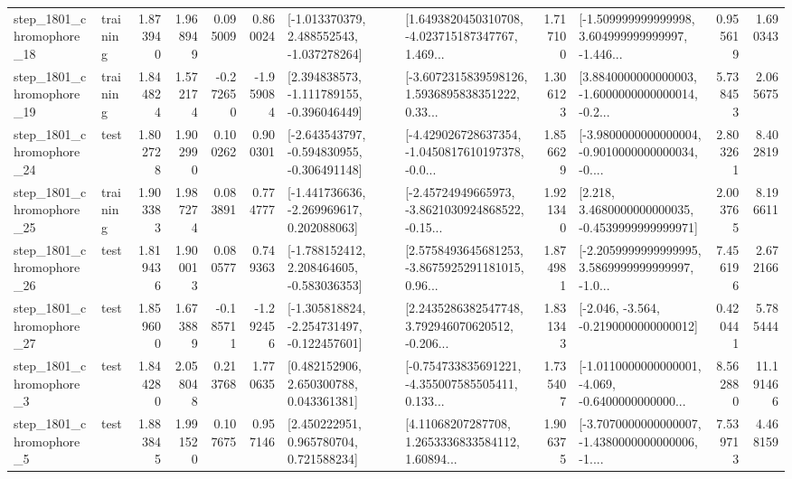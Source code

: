 \begin{tabular}{llrrrrllrlrr}
 step\_1801\_chromophore\_18 &  training &      1.873940 &    1.968949 &      0.095009 &  0.860024 &   [-1.013370379, 2.488552543, -1.037278264] &  [1.6493820450310708, -4.023715187347767, 1.469... &       1.717100 &  [-1.509999999999998, 3.604999999999997, -1.446... &            0.955619 &          1.690343 \\
 step\_1801\_chromophore\_19 &  training &      1.844824 &    1.572174 &     -0.272650 & -1.959084 &   [2.394838573, -1.111789155, -0.396046449] &  [-3.6072315839598126, 1.5936895838351222, 0.33... &       1.306123 &  [3.8840000000000003, -1.6000000000000014, -0.2... &            5.738453 &          2.065675 \\
 step\_1801\_chromophore\_24 &      test &      1.802728 &    1.902990 &      0.100262 &  0.900301 &  [-2.643543797, -0.594830955, -0.306491148] &  [-4.429026728637354, -1.0450817610197378, -0.0... &       1.856629 &  [-3.9800000000000004, -0.9010000000000034, -0.... &            2.803261 &          8.402819 \\
 step\_1801\_chromophore\_25 &  training &      1.903383 &    1.987274 &      0.083891 &  0.774777 &   [-1.441736636, -2.269969617, 0.202088063] &  [-2.45724949665973, -3.8621030924868522, -0.15... &       1.921340 &   [2.218, 3.4680000000000035, -0.4539999999999971] &            2.003765 &          8.196611 \\
 step\_1801\_chromophore\_26 &      test &      1.819436 &    1.900013 &      0.080577 &  0.749363 &   [-1.788152412, 2.208464605, -0.583036353] &  [2.5758493645681253, -3.8675925291181015, 0.96... &       1.874981 &  [-2.2059999999999995, 3.5869999999999997, -1.0... &            7.456196 &          2.672166 \\
 step\_1801\_chromophore\_27 &      test &      1.859600 &    1.673889 &     -0.185711 & -1.292456 &  [-1.305818824, -2.254731497, -0.122457601] &  [2.2435286382547748, 3.792946070620512, -0.206... &       1.831343 &              [-2.046, -3.564, -0.2190000000000012] &            0.420441 &          5.785444 \\
  step\_1801\_chromophore\_3 &      test &      1.844280 &    2.058048 &      0.213768 &  1.770635 &     [0.482152906, 2.650300788, 0.043361381] &  [-0.754733835691221, -4.355007585505411, 0.133... &       1.735407 &  [-1.0110000000000001, -4.069, -0.6400000000000... &            8.562880 &         11.191466 \\
  step\_1801\_chromophore\_5 &      test &      1.883845 &    1.991520 &      0.107675 &  0.957146 &     [2.450222951, 0.965780704, 0.721588234] &  [4.11068207287708, 1.2653336833584112, 1.60894... &       1.906375 &  [-3.7070000000000007, -1.4380000000000006, -1.... &            7.539713 &          4.468159 \\

\end{tabular}
